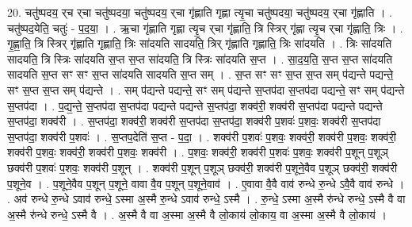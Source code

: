 \documentclass[17pt]{extarticle}
\begin{document}
20. चतु॑ष्पदय॒ र्‌च र्‌चा चतु॑ष्पदया॒ चतु॑ष्पदय॒ र्‌चा गृ॑ह्णाति गृह्णा त्यृ॒चा चतु॑ष्पदया॒ चतु॑ष्पदय॒ र्‌चा गृ॑ह्णाति । . चतु॑ष्पद॒येति॒ चतुः॑ - प॒द॒या॒ । . ऋ॒चा गृ॑ह्णाति गृह्णा त्यृ॒च र्‌चा गृ॑ह्णाति॒ त्रि स्त्रिर् गृ॑ह्णा त्यृ॒च र्‌चा गृ॑ह्णाति॒ त्रिः । . गृ॒ह्णा॒ति॒ त्रि स्त्रिर् गृ॑ह्णाति गृह्णाति॒ त्रिः सा॑दयति सादयति॒ त्रिर् गृ॑ह्णाति गृह्णाति॒ त्रिः सा॑दयति । . त्रिः सा॑दयति सादयति॒ त्रि स्त्रिः सा॑दयति स॒प्त स॒प्त सा॑दयति॒ त्रि स्त्रिः सा॑दयति स॒प्त । . सा॒द॒य॒ति॒ स॒प्त स॒प्त सा॑दयति सादयति स॒प्त सꣳ सꣳ स॒प्त सा॑दयति सादयति स॒प्त सम् । . स॒प्त सꣳ सꣳ स॒प्त स॒प्त सम् प॑द्यन्ते पद्यन्ते॒ सꣳ स॒प्त स॒प्त सम् प॑द्यन्ते । . सम् प॑द्यन्ते पद्यन्ते॒ सꣳ सम् प॑द्यन्ते स॒प्तप॑दा स॒प्तप॑दा पद्यन्ते॒ सꣳ सम् प॑द्यन्ते स॒प्तप॑दा । . प॒द्य॒न्ते॒ स॒प्तप॑दा स॒प्तप॑दा पद्यन्ते पद्यन्ते स॒प्तप॑दा॒ शक्व॑री॒ शक्व॑री स॒प्तप॑दा पद्यन्ते पद्यन्ते स॒प्तप॑दा॒ शक्व॑री । . स॒प्तप॑दा॒ शक्व॑री॒ शक्व॑री स॒प्तप॑दा स॒प्तप॑दा॒ शक्व॑री प॒शवः॑ प॒शवः॒ शक्व॑री स॒प्तप॑दा स॒प्तप॑दा॒ शक्व॑री प॒शवः॑ । . स॒प्तप॒देति॑ स॒प्त - प॒दा॒ । . शक्व॑री प॒शवः॑ प॒शवः॒ शक्व॑री॒ शक्व॑री प॒शवः॒ शक्व॑री॒ शक्व॑री प॒शवः॒ शक्व॑री॒ शक्व॑री प॒शवः॒ शक्व॑री । . प॒शवः॒ शक्व॑री॒ शक्व॑री प॒शवः॑ प॒शवः॒ शक्व॑री प॒शून् प॒शूञ् छक्व॑री प॒शवः॑ प॒शवः॒ शक्व॑री प॒शून् । . शक्व॑री प॒शून् प॒शूञ् छक्व॑री॒ शक्व॑री प॒शूने॒वैव प॒शूञ् छक्व॑री॒ शक्व॑री प॒शूने॒व । . प॒शूने॒वैव प॒शून् प॒शूने॒ वावा वै॒व प॒शून् प॒शूने॒वाव॑ । . ए॒वावा वै॒वै वाव॑ रुन्धे रु॒न्धे ऽवै॒वै वाव॑ रुन्धे । . अव॑ रुन्धे रु॒न्धे ऽवाव॑ रुन्धे॒ ऽस्मा अ॒स्मै रु॒न्धे ऽवाव॑ रुन्धे॒ ऽस्मै । . रु॒न्धे॒ ऽस्मा अ॒स्मै रु॑न्धे रुन्धे॒ ऽस्मै वै वा अ॒स्मै रु॑न्धे रुन्धे॒ ऽस्मै वै । . अ॒स्मै वै वा अ॒स्मा अ॒स्मै वै लो॒काय॑ लो॒काय॒ वा अ॒स्मा अ॒स्मै वै लो॒काय॑ । \newline
\end{document}
